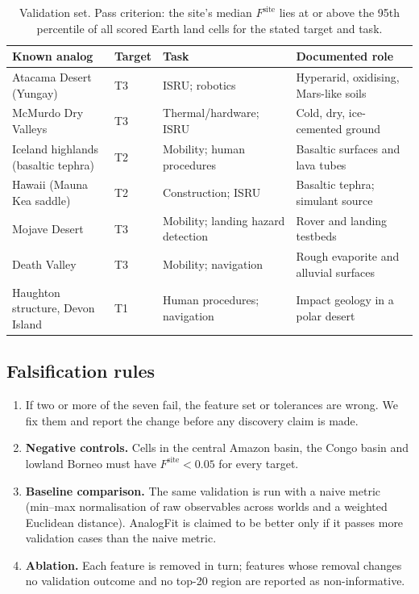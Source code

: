 \documentclass[11pt,a4paper]{article}
\begin{document}
\begin{table}[htbp]
\centering
\caption{Validation set. Pass criterion: the site's median $F^{\mathrm{site}}$ lies at or above the 95th percentile of all scored Earth land cells for the stated target and task.}
\label{tab:validation}
\small
\begin{tabular}{p{3.4cm}p{3.0cm}p{3.6cm}p{4.6cm}}
\toprule
Known analog & Target & Task & Documented role \\
\midrule
Atacama Desert (Yungay) & T3 & ISRU; robotics & Hyperarid, oxidising, Mars-like soils \citep{navarro2003} \\
McMurdo Dry Valleys & T3 & Thermal/hardware; ISRU & Cold, dry, ice-cemented ground \\
Iceland highlands (basaltic tephra) & T2 & Mobility; human procedures & Basaltic surfaces and lava tubes \\
Hawaii (Mauna Kea saddle) & T2 & Construction; ISRU & Basaltic tephra; simulant source \\
Mojave Desert & T3 & Mobility; landing hazard detection & Rover and landing testbeds \\
Death Valley & T3 & Mobility; navigation & Rough evaporite and alluvial surfaces \\
Haughton structure, Devon Island & T1 & Human procedures; navigation & Impact geology in a polar desert \\
\bottomrule
\end{tabular}
\end{table}

\subsection{Falsification rules}
\begin{enumerate}
\item If two or more of the seven fail, the feature set or tolerances are wrong. We fix them and report the change before any discovery claim is made.
\item \textbf{Negative controls.} Cells in the central Amazon basin, the Congo basin and lowland Borneo must have $F^{\mathrm{site}}<0.05$ for every target.
\item \textbf{Baseline comparison.} The same validation is run with a naive metric (min--max normalisation of raw observables across worlds and a weighted Euclidean distance). AnalogFit is claimed to be better only if it passes more validation cases than the naive metric.
\item \textbf{Ablation.} Each feature is removed in turn; features whose removal changes no validation outcome and no top-20 region are reported as non-informative.
\end{enumerate}
\end{document}
